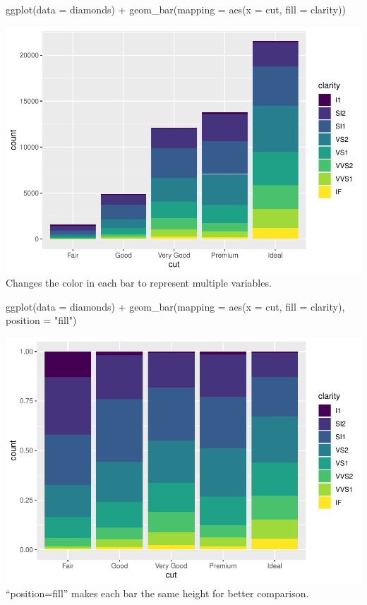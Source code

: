 \documentclass[
]{article}
\newenvironment{Shaded}{\begin{snugshade}}{\end{snugshade}}
\newcommand{\AttributeTok}[1]{\textcolor[rgb]{0.77,0.63,0.00}{#1}}
\newcommand{\FunctionTok}[1]{\textcolor[rgb]{0.00,0.00,0.00}{#1}}
\newcommand{\NormalTok}[1]{#1}
\newcommand{\SpecialCharTok}[1]{\textcolor[rgb]{0.00,0.00,0.00}{#1}}
\newcommand{\StringTok}[1]{\textcolor[rgb]{0.31,0.60,0.02}{#1}}
\begin{document}
\begin{Shaded}
\begin{Highlighting}[]
\FunctionTok{ggplot}\NormalTok{(}\AttributeTok{data =}\NormalTok{ diamonds) }\SpecialCharTok{+} 
  \FunctionTok{geom\_bar}\NormalTok{(}\AttributeTok{mapping =} \FunctionTok{aes}\NormalTok{(}\AttributeTok{x =}\NormalTok{ cut, }\AttributeTok{fill =}\NormalTok{ clarity))}
\end{Highlighting}
\end{Shaded}

\includegraphics{Assignments_files/figure-latex/unnamed-chunk-49-1.pdf}
Changes the color in each bar to represent multiple variables.

\begin{Shaded}
\begin{Highlighting}[]
\FunctionTok{ggplot}\NormalTok{(}\AttributeTok{data =}\NormalTok{ diamonds) }\SpecialCharTok{+} 
  \FunctionTok{geom\_bar}\NormalTok{(}\AttributeTok{mapping =} \FunctionTok{aes}\NormalTok{(}\AttributeTok{x =}\NormalTok{ cut, }\AttributeTok{fill =}\NormalTok{ clarity), }\AttributeTok{position =} \StringTok{"fill"}\NormalTok{)}
\end{Highlighting}
\end{Shaded}

\includegraphics{Assignments_files/figure-latex/unnamed-chunk-50-1.pdf}
``position=fill'' makes each bar the same height for better comparison.
\end{document}
